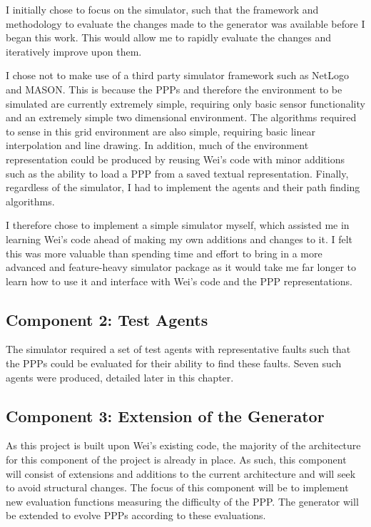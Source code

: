 \documentclass[authoryearcitations]{UoYCSproject}
\begin{document}
I initially chose to focus on the simulator, such that the framework and methodology to evaluate the changes made to the generator was available before I began this work. This would allow me to rapidly evaluate the changes and iteratively improve upon them. 

I chose not to make use of a third party simulator framework such as NetLogo and MASON. This is because the PPPs and therefore the environment to be simulated are currently extremely simple, requiring only basic sensor functionality and an extremely simple two dimensional environment. The algorithms required to sense in this grid environment are also simple, requiring basic linear interpolation and line drawing. In addition, much of the environment representation could be produced by reusing Wei's code with minor additions such as the ability to load a PPP from a saved textual representation. Finally, regardless of the simulator, I had to implement the agents and their path finding algorithms.

I therefore chose to implement a simple simulator myself, which assisted me in learning Wei's code ahead of making my own additions and changes to it. I felt this was more valuable than spending time and effort to bring in a more advanced and feature-heavy simulator package as it would take me far longer to learn how to use it and interface with Wei's code and the PPP representations.

\subsection{Component 2: Test Agents}
\label{sec:da_3_2}

The simulator required a set of test agents with representative faults such that the PPPs could be evaluated for their ability to find these faults. Seven such agents were produced, detailed later in this chapter.

\subsection{Component 3: Extension of the Generator}
\label{sec:da_3_3}
As this project is built upon Wei's existing code, the majority of the architecture for this component of the project is already in place. As such, this component will consist of extensions and additions to the current architecture and will seek to avoid structural changes. The focus of this component will be to implement new evaluation functions measuring the difficulty of the PPP. The generator will be extended to evolve PPPs according to these evaluations.
\end{document}
